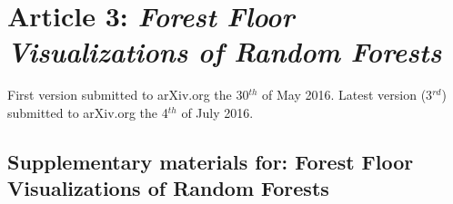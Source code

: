 \section{Article 3: \textit{Forest Floor Visualizations of Random Forests}}
\label{article:forest}
First version submitted to arXiv.org the 30$^{th}$ of May 2016.
Latest version (3$^{rd}$) submitted to arXiv.org the 4$^{th}$ of July 2016.

\newpage


\subsection{Supplementary materials for: Forest Floor Visualizations of Random Forests}
\label{forestFloorSuppl}
